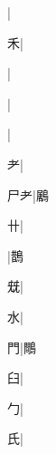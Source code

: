\begin{multicols}{2}
{{\cjk{}{\cnsym{}　}{\cnsym{}　}{\cnsym{}　}}|{}\par
{\cjk{}{\cnsym{}　}{\cnsym{}　}禾}|{}\par
{\cjk{}{\cnsym{}　}{\cnsym{}　}{\cnsym{}　}}|{}\par
{}|{}\par
{}|{}\par
{\cjk{}{\cnsym{}　}{\cnsym{}　}耂}|{}\par
{\cjk{}{\cnsym{}　}尸耂}|{\cjk{}鷵}\par
{\cjk{}{\cnsym{}　}{\cnsym{}　}卄}|{}\par
{}|{\cjk{}鵲}\par
{\cjk{}{\cnsym{}　}{\cnsym{}　}兓}|{}\par
{\cjk{}{\cnsym{}　}{\cnsym{}　}水}|{}\par
{\cjk{}{\cnsym{}　}{\cnsym{}　}門}|{\cjk{}鷼}\par
{\cjk{}{\cnsym{}　}{\cnsym{}　}臼}|{}\par
{\cjk{}{\cnsym{}　}{\cnsym{}　}勹}|{}\par
{\cjk{}{\cnsym{}　}{\cnsym{}　}氏}|{}\par
}
\end{multicols}
